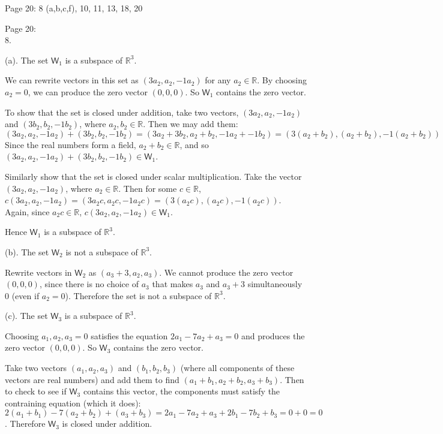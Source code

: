 \documentclass[11pt]{article}
\newcommand{\br}[1]{\left(#1\right)}
\begin{document}
Page 20:  8 (a,b,c,f), 10, 11, 13, 18, 20

Page 20: \\

8.

(a). The set $\mathsf{W}_1$ is a subspace of $\mathbb{R}^3$. 

We can rewrite vectors in this set as $\br{3a_2, a_2, -1a_2}$ for any $a_2\in\mathbb{R}$. By choosing $a_2 = 0$, we can produce the zero vector $\br{0,0,0}$. So $\mathsf{W}_1$ contains the zero vector.

To show that the set is closed under addition, take two vectors, $\br{3a_2, a_2, -1a_2}$ and $\br{3b_2, b_2, -1b_2}$, where $a_2,b_2\in\mathbb{R}$. Then we may add them: \\ $\br{3a_2, a_2, -1a_2} + \br{3b_2, b_2, -1b_2} = \br{3a_2 + 3b_2, a_2 + b_2, -1a_2 + -1b_2} = \br{3(a_2+b_2), (a_2+b_2), -1(a_2+b_2)}$ Since the real numbers form a field, $a_2+b_2\in\mathbb{R}$, and so $\br{3a_2, a_2, -1a_2} + \br{3b_2, b_2, -1b_2} \in \mathsf{W}_1$.

Similarly show that the set is closed under scalar multiplication. Take the vector $\br{3a_2, a_2, -1a_2}$, where $a_2\in\mathbb{R}$. Then for some $c\in\mathbb{R}$, $c\br{3a_2, a_2, -1a_2} = \br{3a_2c, a_2c, -1a_2c} = \br{3(a_2c), (a_2c), -1(a_2c)}$. Again, since $a_2c \in\mathbb{R}$, $c\br{3a_2, a_2, -1a_2}\in\mathsf{W}_1$.

Hence $\mathsf{W}_1$ is a subspace of $\mathbb{R}^3$.

(b). The set $\mathsf{W}_2$ is not a subspace of $\mathbb{R}^3$.

Rewrite vectors in $\mathsf{W}_2$ as $\br{a_3+3, a_2, a_3}$. We cannot produce the zero vector $\br{0,0,0}$, since there is no choice of $a_3$ that makes $a_3$ and $a_3+3$ simultaneously $0$ (even if $a_2=0$). Therefore the set is not a subspace of $\mathbb{R}^3$.

(c). The set $\mathsf{W}_3$ is a subspace of $\mathbb{R}^3$.

Choosing $a_1,a_2,a_3 = 0$ satisfies the equation $2a_1-7a_2+a_3=0$ and produces the zero vector $\br{0,0,0}$. So $\mathsf{W}_3$ contains the zero vector.

Take two vectors $\br{a_1,a_2,a_3}$ and $\br{b_1,b_2,b_3}$ (where all components of these vectors are real numbers) and add them to find $\br{a_1+b_1, a_2+b_2, a_3+b_3}$. Then to check to see if $\mathsf{W}_3$ contains this vector, the components must satisfy the contraining equation (which it does): $2\br{a_1+b_1} - 7\br{a_2+b_2} + \br{a_3+b_3} = 2a_1 - 7a_2+a_3 + 2b_1-7b_2+b_3 = 0+0 = 0$. Therefore $\mathsf{W}_3$ is closed under addition.
\end{document}
